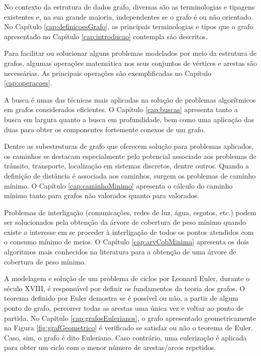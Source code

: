 	No contexto da estrutura de dados grafo, diversas são as terminologias e tipagens existentes e, na sua grande maioria, independentes se o grafo é ou não orientado. No Capítulo \ref{cap:definicoesGrafo}, as principais terminologias e tipos que o grafo apresentado no Capítulo \ref{cap:introducao} contempla são descritos.
	
	Para facilitar ou solucionar alguns problemas modelados por meio da estrutura de grafos,  algumas operações matemática nos seus conjuntos de vértices e arestas são necessárias. As principais operações são exemplificadas no Capítulo \ref{cap:operacoes}.
	
	A busca é umas das técnicas mais aplicadas na solução de problemas algorítmicos em grafos considerados eficientes. O Capítulo \ref{cap:buscas} apresenta tanto a busca em largura quanto a busca em profundidade, bem como uma aplicação das duas para obter os componentes fortemente conexos de um grafo.
	
	Dentre as subestruturas de grafo que oferecem solução para problemas aplicados, os caminhos se destacam especialmente pelo potencial associado aos problemas de trânsito, transporte, localização em sistemas discretos, dentre outros. Quando a definição de distância é associada aos caminhos, surgem os problemas de caminho mínimo. O Capítulo \ref{cap:caminhoMinimo} apresenta o cálculo do caminho mínimo tanto para grafos não valorados quanto para valorados.
	
	Problemas de interligação (comunicações, redes de luz, água, esgotos, etc.) podem ser solucionados pela obtenção da árvore de cobertura de peso mínimo quando existe o interesse em se proceder à interligação de todos os pontos atendidos com o consumo mínimo de meios. O Capítulo \ref{cap:arvCobMinima} apresenta os dois algoritmos mais conhecidos na literatura para a obtenção de uma árvore de cobertura de peso mínimo.
	
	A modelagem e solução de um problema de ciclos por Leonard Euler, durante o século XVIII, é responsável por definir os fundamentos da teoria dos grafos. O teorema definido por Euler demostra se é possível ou não, a partir de algum ponto do grafo, percorrer todas as arestas uma única vez e voltar ao ponto de partida. No Capítulo \ref{cap:grafosEulerianos}, o grafo apresentado geometricamente na Figura \ref{fig:grafGeometrico} é verificado se satisfaz ou não o teorema de Euler. Caso, sim, o grafo é dito Euleriano. Caso contrário, uma eulerização é aplicada para obter um ciclo com o menor número de arestas/arcos repetidos.
	
